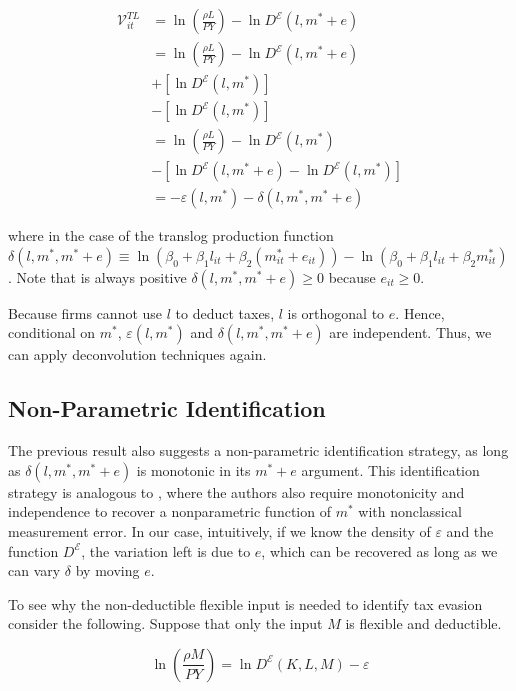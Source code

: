 \documentclass[
  12pt]{article}
\begin{document}
\[
\begin{aligned}
\mathcal{V}_{it}^{TL} &=\ln\left(\frac{\rho L}{PY}\right)-\ln D^{\mathcal{E}}(l,m^*+e)\\
    &=\ln\left(\frac{\rho L}{PY}\right)-\ln D^{\mathcal{E}}(l,m^*+e)\\
    &+\left[\ln D^{\mathcal{E}}(l,m^*)\right]\\
    &-\left[\ln D^{\mathcal{E}}(l,m^*)\right] \\
    &=\ln\left(\frac{\rho L}{PY}\right)-\ln D^{\mathcal{E}}(l,m^*) \\
    &-\left[\ln D^{\mathcal{E}}(l,m^*+e)-\ln D^{\mathcal{E}}(l,m^*)\right]\\
    &= -\varepsilon(l,m^*) - \delta(l,m^*,m^*+e)
\end{aligned}
\]

where in the case of the translog production function
\(\delta(l,m^*,m^*+e)\equiv \ln \left(\beta_0+\beta_1l_{it}+\beta_2(m^*_{it}+e_{it})\right)-\ln \left(\beta_0+\beta_1l_{it}+\beta_2m^*_{it}\right)\).
Note that is always positive \(\delta(l,m^*,m^*+e)\ge0\) because
\(e_{it}\ge0\).

Because firms cannot use \(l\) to deduct taxes, \(l\) is orthogonal to
\(e\). Hence, conditional on \(m^*\), \(\varepsilon(l,m^*)\) and
\(\delta(l,m^*,m^*+e)\) are independent. Thus, we can apply
deconvolution techniques again.

\subsection{Non-Parametric
Identification}\label{non-parametric-identification}

The previous result also suggests a non-parametric identification
strategy, as long as \(\delta(l,m^*,m^*+e)\) is monotonic in its
\(m^*+e\) argument. This identification strategy is analogous to
\citet{Hu2022b}, where the authors also require monotonicity and
independence to recover a nonparametric function of \(m^*\) with
nonclassical measurement error. In our case, intuitively, if we know the
density of \(\varepsilon\) and the function \(D^{\mathcal{E}}\), the
variation left is due to \(e\), which can be recovered as long as we can
vary \(\delta\) by moving \(e\).

To see why the non-deductible flexible input is needed to identify tax
evasion consider the following. Suppose that only the input \(M\) is
flexible and deductible.

\[
\ln\left(\frac{\rho M}{PY}\right)=\ln D^{\mathcal{E}}(K,L,M)-\varepsilon
\]
\end{document}
